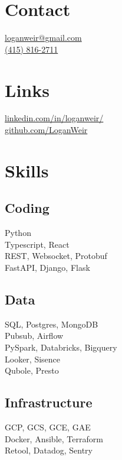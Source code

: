 \begin{minipage}[t]{0.33\textwidth}
  \vspace{0pt}

  \section{Contact}
  \href{mailto:loganweir@gmail.com}{loganweir@gmail.com}\\
  \href{tel:14158162711}{(415) 816-2711}
  \sectionsepright

  \section{Links}
  \href{https://www.linkedin.com/in/loganweir/}{linkedin.com/in/loganweir/}\\
  \href{https://github.com/LoganWeir}{github.com/LoganWeir}
  \sectionsepright

  \section{Skills}

  \subsection{Coding}
  Python\\
  Typescript, React\\
  REST, Websocket, Protobuf\\
  FastAPI, Django, Flask
  \sectionsepright

  \subsection{Data}
  SQL, Postgres, MongoDB\\
  Pubsub, Airflow\\
  PySpark, Databricks, Bigquery\\
  Looker, Sisence\\
  Qubole, Presto
  \sectionsepright

  \subsection{Infrastructure}
  GCP, GCS, GCE, GAE\\
  Docker, Ansible, Terraform\\
  Retool, Datadog, Sentry
  \sectionsepright


\end{minipage}
